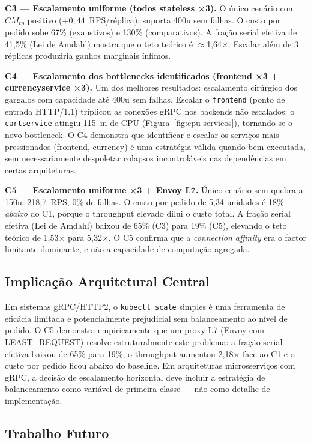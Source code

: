 \documentclass[manuscript,screen,review]{acmart}
\begin{document}
\textbf{C3 — Escalamento uniforme (todos stateless ×3).} O único cenário com $CM_{tp}$ positivo ($+0{,}44$~RPS/réplica): suporta 400u sem falhas. O custo por pedido sobe 67\% (exaustivos) e 130\% (comparativos). A fração serial efetiva de 41,5\% (Lei de Amdahl) mostra que o teto teórico é $\approx$1,64$\times$. Escalar além de 3 réplicas produziria ganhos marginais ínfimos.

\textbf{C4 — Escalamento dos bottlenecks identificados (frontend ×3 + currencyservice ×3).} Um dos melhores resultados: escalamento cirúrgico dos gargalos com capacidade até 400u sem falhas. Escalar o \texttt{frontend} (ponto de entrada HTTP/1.1) triplicou as conexões gRPC nos backends não escalados: o \texttt{cartservice} atingiu 115~m de CPU (Figura~\ref{fig:cpu-servicos}), tornando-se o novo bottleneck. O C4 demonstra que identificar e escalar os serviços mais pressionados (frontend, currency) é uma estratégia válida quando bem executada, sem necessariamente despoletar colapsos incontroláveis nas dependências em certas arquiteturas.

\textbf{C5 — Escalamento uniforme ×3 + Envoy L7.} Único cenário sem quebra a 150u: 218,7~RPS, 0\% de falhas. O custo por pedido de 5,34 unidades é 18\% \emph{abaixo} do C1, porque o throughput elevado dilui o custo total. A fração serial efetiva (Lei de Amdahl) baixou de 65\% (C3) para 19\% (C5), elevando o teto teórico de 1,53$\times$ para 5,32$\times$. O C5 confirma que a \textit{connection affinity} era o factor limitante dominante, e não a capacidade de computação agregada.

\subsection{Implicação Arquitetural Central}

Em sistemas gRPC/HTTP2, o \texttt{kubectl scale} simples é uma ferramenta de eficácia limitada e potencialmente prejudicial sem balanceamento ao nível de pedido. O C5 demonstra empiricamente que um proxy L7 (Envoy com LEAST\_REQUEST) resolve estruturalmente este problema: a fração serial efetiva baixou de 65\% para 19\%, o throughput aumentou 2,18$\times$ face ao C1 e o custo por pedido ficou abaixo do baseline. Em arquiteturas microsserviços com gRPC, a decisão de escalamento horizontal deve incluir a estratégia de balanceamento como variável de primeira classe — não como detalhe de implementação.

\subsection{Trabalho Futuro}
\end{document}
